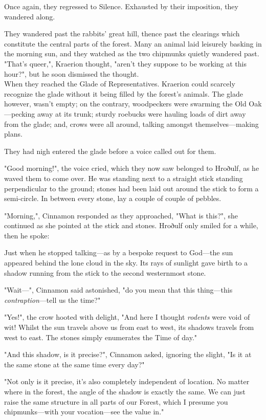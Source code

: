 Once again, they regressed to Silence. Exhausted by their imposition, they wandered along.

They wandered past the rabbits' great hill, thence past the clearings which constitute the central parts of the forest. Many an animal laid leisurely basking in the morning sun, and they watched as the two chipmunks quietly wandered past. "That's queer,", Kraerion thought, "aren't they suppose to be working at this hour?", but he soon dismissed the thought.\\

When they reached the Glade of Representatives. Kraerion could scarcely recognize the glade without it being filled by the forest's animals. The glade however, wasn't empty; on the contrary, woodpeckers were swarming the Old Oak---pecking away at its trunk; sturdy roebucks were hauling loads of dirt away from the glade; and, crows were all around, talking amongst themselves---making plans. 

They had nigh entered the glade before a voice called out for them. 

"Good morning!", the voice cried, which they now saw belonged to Hroðulf, as he waved them to come over. He was standing next to a straight stick standing perpendicular to the ground; stones had been laid out around the stick to form a semi-circle. In between every stone, lay a couple of couple of pebbles.

"Morning,", Cinnamon responded as they approached, "What is this?", she continued as she pointed at the stick and stones. Hroðulf only smiled for a while, then he spoke:



Just when he stopped talking---as by a bespoke request to God---the sun appeared behind the lone cloud in the sky. Its rays of sunlight gave birth to a shadow running from the stick to the second westernmost stone.

"Wait---", Cinnamon said astonished, "do you mean that this thing---this \textit{contraption}---tell us the time?"

"Yes!", the crow hooted with delight, "And here I thought \textit{rodents} were void of wit! Whilst the sun travels above us from east to west, its shadows travels from west to east. The stones simply enumerates the Time of day."

"And this shadow, is it precise?", Cinnamon asked, ignoring the slight, "Is it at the same stone at the same time every day?"

"Not only is it precise, it's also completely independent of location. No matter where in the forest, the angle of the shadow is exactly the same. We can just raise the same structure in all parts of our Forest, which I presume you chipmunks---with your vocation---see the value in."

